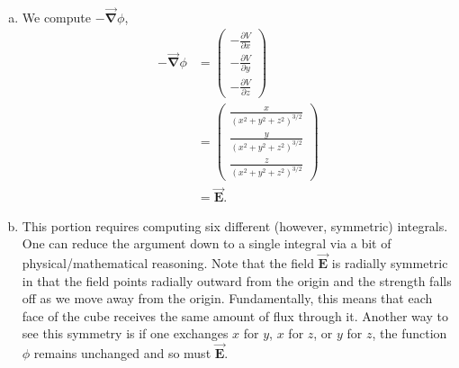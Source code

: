 \documentclass[12pt]{article} %
\newcommand{\grad}{\boldsymbol{\vec{\nabla}}}
\newcommand{\vecfieldE}{\boldsymbol{\vec{E}}}
\begin{document}
\begin{solution}~
    \begin{enumerate}[(a)]
        \item   We compute $-\grad \phi$,
        \begin{align*}
            -\grad \phi &= \begin{pmatrix} -\frac{\partial V}{\partial x} \\ -\frac{\partial V}{\partial y} \\ -\frac{\partial V}{\partial z} \end{pmatrix}\\
            &= \begin{pmatrix} \frac{x}{(x^2+y^2+z^2)^{3/2}} \\ \frac{y}{(x^2+y^2+z^2)^{3/2}} \\ \frac{z}{(x^2+y^2+z^2)^{3/2}} \end{pmatrix}\\
            &= \vecfieldE.
        \end{align*}
        \item This portion requires computing six different (however, symmetric) integrals.  One can reduce the argument down to a single integral via a bit of physical/mathematical reasoning. Note that the field $\vecfieldE$ is radially symmetric in that the field points radially outward from the origin and the strength falls off as we move away from the origin.  Fundamentally, this means that each face of the cube receives the same amount of flux through it. Another way to see this symmetry is if one exchanges $x$ for $y$, $x$ for $z$, 
or $y$ for $z$, the function $\phi$ remains unchanged and so must $\vecfieldE$.
        

\end{enumerate}
\end{solution}
\end{document}
